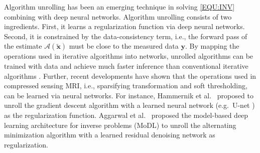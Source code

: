 \documentclass[journal,twoside,web]{ieeecolor}
\newcommand{\argmin}{\operatornamewithlimits{argmin}}
\newcommand{\norm}[1]{\left\lVert#1\right\rVert}
\begin{document}
	Algorithm unrolling has been an emerging technique
	in solving \cref{EQU:INV} combining with deep neural networks.
    Algorithm unrolling consists of two ingredients.
	First, it learns a regularization function
	via deep neural networks.
	Second, it is constrained
	by the data-consistency term,
	i.e., the forward pass of the estimate $\mathcal{A} (\mathbf{\tilde{x}})$
	must be close to the measured data $\mathbf{y}$.
    By mapping the operations used in iterative algorithms
    into networks, unrolled algorithms can be trained with data
    and achieve much faster inference
    than conventional iterative algorithms \cite{monga_2021_algunroll}.
    Further, recent developments have shown that
    the operations used in compressed sensing MRI,
    i.e., sparsifying transformation and soft thresholding,
    can be learned via neural networks.
    For instance, Hammernik et al.~\cite{hammernik_2018_varnet}
    proposed to unroll the gradient descent algorithm
    with a learned neural network
    (e.g.~U-net \cite{ronneberger_2015_unet})
    as the regularization function.
    Aggarwal et al.~\cite{aggarwal_2018_modl} proposed
    the model-based deep learning architecture for inverse problems (MoDL)
    to unroll the alternating minimization algorithm
    with a learned residual denoising network \cite{he_2016_resnet}
    as regularization.

\end{document}
